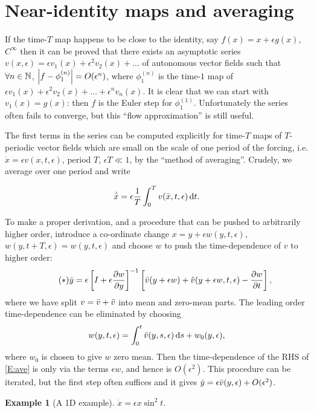 \documentclass{notes}
\theoremstyle{plain}
\newtheorem*{example}{Example}
\begin{document}
\section{Near-identity maps and averaging}

If the time-$T$ map happens to be close to the identity, say
$f(x) = x + \epsilon g(x)$, $C^\infty$ then it can be proved that
there exists an asymptotic series $v(x,\epsilon) = \epsilon v_1(x)
+ \epsilon^2 v_2(x) + \dots$ of autonomous vector fields such that
$\forall n \in \mathbb{N}$, $\left|f - \phi_1^{(n)}\right| = O(\epsilon^n)$, where
$\phi_1^{(n)}$ is the time-$1$ map of $\epsilon v_1(x)
+ \epsilon^2 v_2(x) + \dots + \epsilon^n v_n(x)$.  It is clear
that we can start with $v_1(x) = g(x)$: then $f$ is the Euler step for
$\phi_1^{(1)}$.  Unfortunately the series often fails to converge, but this
``flow approximation'' is still useful.

The first terms in the series can be computed explicitly for
time-$T$ maps of $T$-periodic vector fields which are small on the
scale of one period of the forcing, i.e. $\dot{x} = \epsilon 
v(x,t,\epsilon)$, period $T$, $\epsilon T \ll 1$, by the ``method of
averaging''.  Crudely, we average over one period and write

\[
\dot{\Bar{x}} = \epsilon \frac{1}{T} \int_0^T
v(\Bar{x},t,\epsilon)\,\mathrm{d} t.
\]

To make a proper derivation, and a procedure that can be pushed to
arbitrarily higher order, introduce a co-ordinate change
$x = y + \epsilon w(y,t,\epsilon)$, $w(y,t+T,\epsilon) = w(y,t,\epsilon)$
and choose $w$ to push the time-dependence of $v$ to higher order:
\begin{equation}\label{E:ave}\tag{$\ast$}
\dot{y} = \epsilon \left[
I + \epsilon \frac{\partial w}{\partial y}
\right]^{-1}
\left[
\Bar{v}(y + \epsilon w) + \tilde{v}(y + \epsilon w,t,\epsilon)
- \frac{\partial w}{\partial t}
\right],
\end{equation}
where we have split $v = \Bar{v} + \tilde{v}$ into mean and zero-mean parts.
The leading order time-dependence can be eliminated by choosing
\[
w(y,t,\epsilon) = \int_0^t \tilde{v}(y,s,\epsilon)\,\mathrm{d} s + w_0(y,\epsilon),
\]
where $w_0$ is chosen to give $w$ zero mean.  Then the time-dependence 
of the RHS of \eqref{E:ave} is only via the terms $\epsilon w$, and hence
is $O(\epsilon^2)$.  This procedure can be iterated, but the first
step often suffices and it gives $\dot{y} = \epsilon \Bar{v}(y,\epsilon)
+ O(\epsilon^2)$.

\begin{example}[A 1D example]
$\dot{x} = \epsilon x \sin^2 t$.
\end{example}
\end{document}

